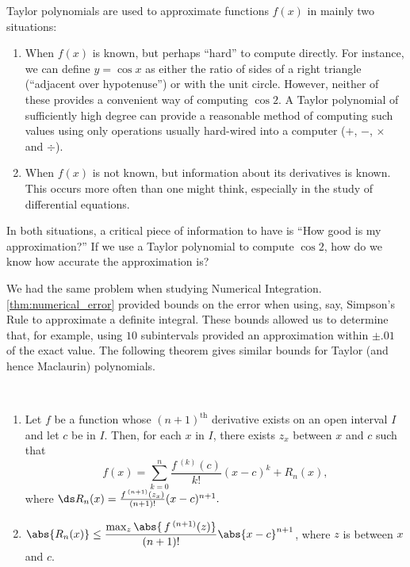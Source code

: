 Taylor polynomials are used to approximate functions $f(x)$ in mainly two situations:
\begin{enumerate}
	\item	When $f(x)$ is known, but perhaps ``hard'' to compute directly. For instance, we can define $y=\cos x$ as either the ratio of sides of a right triangle (``adjacent over hypotenuse'') or with the unit circle. However, neither of these provides a convenient way of computing $\cos 2$. A Taylor polynomial of sufficiently high degree can provide a reasonable method of computing such values using only operations usually hard-wired into a computer ($+$, $-$, $\times$ and $\div$).
	
	\item	When $f(x)$ is not known, but information about its derivatives is known. This occurs more often than one might think, especially in the study of differential equations.
\end{enumerate}

	
In both situations, a critical piece of information to have is ``How good is my approximation?'' If we use a Taylor polynomial to compute $\cos 2$, how do we know how accurate the approximation is? 

We had the same problem when studying Numerical Integration. \autoref{thm:numerical_error} provided bounds on the error when using, say, Simpson's Rule to approximate a definite integral. These bounds allowed us to determine that, for example, using $10$ subintervals provided an approximation within $\pm .01$ of the exact value. The following theorem gives similar bounds for Taylor (and hence Maclaurin) polynomials.

{
\begin{theorem}\label{thm:taylorthm}
\mbox{}\\[-2\baselineskip]
\begin{enumerate}
	\item	Let $f$ be a function whose $(n+1)^{\text{th}}$ derivative exists on an open interval $I$ and let $c$ be in $I$. Then, for each $x$ in $I$, there exists $z_x$ between $x$ and $c$ such that
\[f(x) = \sum_{k=0}^n\frac{f\,^{(k)}(c)}{k!}(x-c)^k+R_n(x),\]
where $\ds R_n(x) = \frac{f\,^{(n+1)}(z_x)}{(n+1)!}(x-c)^{n+1}.$
	\item	$\abs{R_n(x)}\leq\dfrac{\max_z\abs{\,f\,^{(n+1)}(z)}}{(n+1)!}\abs{x-c}^{n+1}$, where $z$ is between $x$ and $c$.
\end{enumerate}
\end{theorem}}


